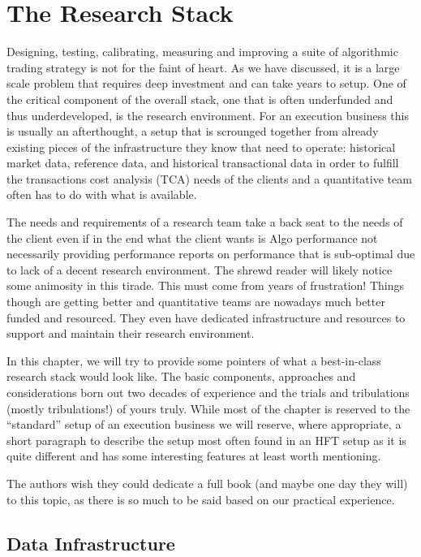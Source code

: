 \chapter{The Research Stack}\label{chap:ch_tech_res}

Designing, testing, calibrating, measuring and improving a suite of algorithmic trading strategy is not for the faint of heart. As we have discussed, it is a large scale problem that requires deep investment and can take years to setup. One of the critical component of the overall stack, one that is often underfunded and thus underdeveloped, is the research environment. For an execution business this is usually an afterthought, a setup that is scrounged together from already existing pieces of the infrastructure they know that need to operate: historical market data, reference data, and historical transactional data in order to fulfill the transactions cost analysis (TCA) needs of the clients and a quantitative team often has to do with what is available.


The needs and requirements of a research team take a back seat to the needs of the client even if in the end what the client wants is Algo performance not necessarily providing performance reports on  performance that is sub-optimal due to lack of a decent research environment. The shrewd reader will likely notice some animosity in this tirade. This must come from years of frustration! Things though are getting better and quantitative teams are nowadays much better funded and resourced. They even have dedicated infrastructure and resources to support and maintain their research environment.


In this chapter, we will try to provide some pointers of what a best-in-class research stack would look like. The basic components, approaches and considerations born out two decades of experience and the trials and tribulations (mostly tribulations!) of yours truly. While most of the chapter is reserved to the ``standard'' setup of an execution business we will reserve, where appropriate, a short paragraph to describe the setup most often found in an HFT setup as it is quite different and has some interesting features at least worth mentioning.


The authors wish they could dedicate a full book (and maybe one day they will) to this topic, as there is so much to be said based on our practical experience. 



\section{Data Infrastructure}


